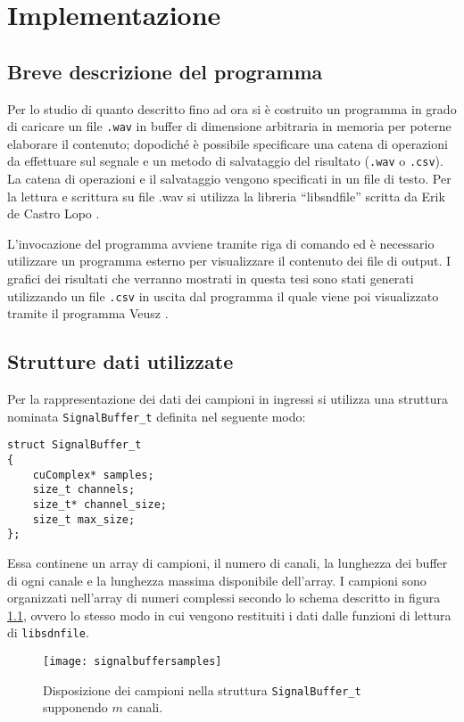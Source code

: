 \chapter{Implementazione}

\section{Breve descrizione del programma}
Per lo studio di quanto descritto fino ad ora si è costruito un programma in grado di caricare un file \lstinline{.wav} in buffer di dimensione arbitraria in memoria per poterne elaborare il contenuto; dopodiché è possibile specificare una catena di operazioni da effettuare sul segnale e un metodo di salvataggio del risultato (\lstinline{.wav} o \lstinline{.csv}). La catena di operazioni e il salvataggio vengono specificati in un file di testo. Per la lettura e scrittura su file .wav si utilizza la libreria ``libsndfile'' scritta da Erik de Castro Lopo \cite{libsndfile}.

L'invocazione del programma avviene tramite riga di comando ed è necessario utilizzare un programma esterno per visualizzare il contenuto dei file di output. I grafici dei risultati che verranno mostrati in questa tesi sono stati generati utilizzando un file \lstinline{.csv} in uscita dal programma il quale viene poi visualizzato tramite il programma Veusz \cite{veusz}.

\section{Strutture dati utilizzate}

Per la rappresentazione dei dati dei campioni in ingressi si utilizza una struttura nominata \lstinline{SignalBuffer_t} definita nel seguente modo:

\begin{lstlisting}
struct SignalBuffer_t
{
	cuComplex* samples;
	size_t channels;
	size_t* channel_size;
	size_t max_size;
};
\end{lstlisting}

Essa continene un array di campioni, il numero di canali, la lunghezza dei buffer di ogni canale e la lunghezza massima disponibile dell'array. I campioni sono organizzati nell'array di numeri complessi secondo lo schema descritto in figura \ref{fig:signalbuffersamples}, ovvero lo stesso modo in cui vengono restituiti i dati dalle funzioni di lettura di \lstinline{libsdnfile}.

\begin{figure}[h]
    \centering
    \texttt{[image: signalbuffersamples]}
    \caption{Disposizione dei campioni nella struttura \lstinline{SignalBuffer_t} supponendo $m$ canali.}
    \label{fig:signalbuffersamples}
\end{figure}

